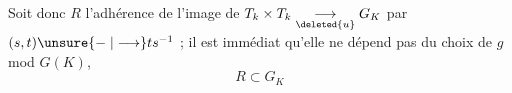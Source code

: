 Soit donc $R$ \unsure{:} l'adhérence de l'image de $T_k\times T_k\underset{\deleted{u}}{\longrightarrow}G_K$ par $(s,t)\unsure{\mathrel{-}|\longrightarrow}ts^{-1}$ ; il est immédiat qu'elle ne dépend pas du choix de $g$ mod $G(K)$, 
\[
\boxed{R\subset G_K}
\]
{\centering \textsc{ }\\
\textit{ }\par}
